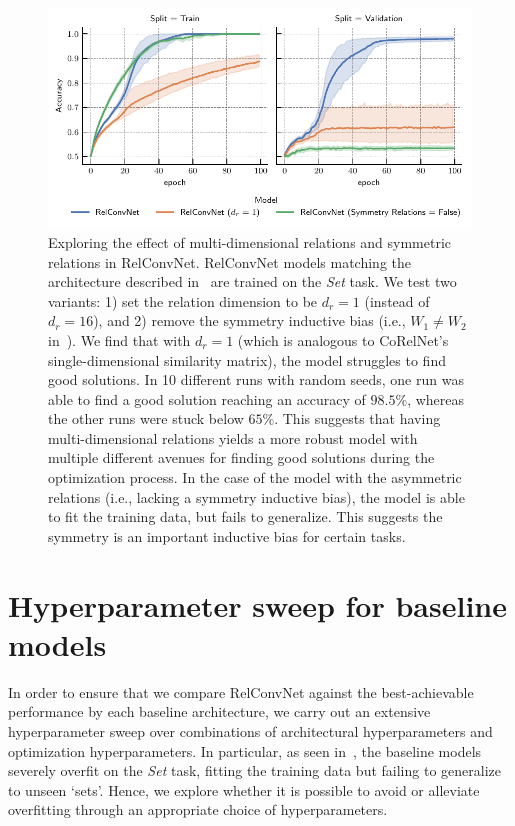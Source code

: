 \begin{figure}[H]
    \centering
    \includegraphics{figs/experiments/contains_set_training_curves_relconvnet_ablation.pdf}
    \caption{Exploring the effect of multi-dimensional relations and symmetric relations in RelConvNet. RelConvNet models matching the architecture described in~ are trained on the \textit{Set} task. We test two variants: 1) set the relation dimension to be $d_r = 1$ (instead of $d_r = 16$), and 2) remove the symmetry inductive bias (i.e., $W_1 \neq W_2$ in~). We find that with $d_r = 1$ (which is analogous to CoRelNet's single-dimensional similarity matrix), the model struggles to find good solutions. In 10 different runs with random seeds, one run was able to find a good solution reaching an accuracy of $98.5\%$, whereas the other runs were stuck below $65\%$. This suggests that having multi-dimensional relations yields a more robust model with multiple different avenues for finding good solutions during the optimization process. In the case of the model with the asymmetric relations (i.e., lacking a symmetry inductive bias), the model is able to fit the training data, but fails to generalize. This suggests the symmetry is an important inductive bias for certain tasks.}\label{fig:set_relconvnet_ablations}
\end{figure}

\section{Hyperparameter sweep for baseline models}\label{ssec:baseline_hyperparameter_sweep}

In order to ensure that we compare RelConvNet against the best-achievable performance by each baseline architecture, we carry out an extensive hyperparameter sweep over combinations of architectural hyperparameters and optimization hyperparameters. In particular, as seen in~, the baseline models severely overfit on the \textit{Set} task, fitting the training data but failing to generalize to unseen `sets'. Hence, we explore whether it is possible to avoid or alleviate overfitting through an appropriate choice of hyperparameters.

